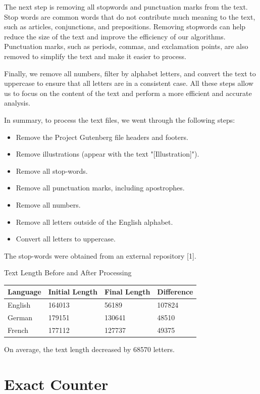 \documentclass[]{revdetua}
\begin{document}
The next step is removing all stopwords and punctuation marks from the text. Stop words are common words that do not contribute much meaning to the text, such as articles, conjunctions, and prepositions. Removing stopwords can help reduce the size of the text and improve the efficiency of our algorithms. Punctuation marks, such as periods, commas, and exclamation points, are also removed to simplify the text and make it easier to process.

Finally, we remove all numbers, filter by alphabet letters, and convert the text to uppercase to ensure that all letters are in a consistent case. All these steps allow us to focus on the content of the text and perform a more efficient and accurate analysis.

In summary, to process the text files, we went through the following steps:
\begin{itemize}
\item Remove the Project Gutenberg file headers and footers.
\item Remove illustrations (appear with the text "[Illustration]").
\item Remove all stop-words.
\item Remove all punctuation marks, including apostrophes.
\item Remove all numbers.
\item Remove all letters outside of the English alphabet.
\item Convert all letters to uppercase.
\end{itemize}

The stop-words were obtained from an external repository [1].

\begin{table}[!ht]
    \centering
    Text Length Before and After Processing
    \begin{tabular}{|l|l|l|l|}
    \hline
        Language & Initial Length & Final Length & Difference \\ \hline
        English & 164013 & 56189 & 107824 \\ \hline
        German & 179151 & 130641 & 48510 \\ \hline
        French & 177112 & 127737 & 49375 \\ \hline
    \end{tabular}
\end{table}

On average, the text length decreased by 68570 letters.	 

\section{Exact Counter}
\end{document}

